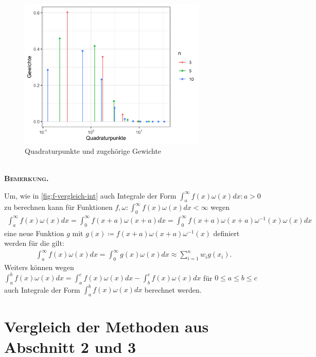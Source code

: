\documentclass[12pt,a4paper]{scrartcl}
\numberwithin{equation}{section}
\numberwithin{myalgctr}{section}
\numberwithin{mytheoremctr}{subsection}
\numberwithin{mykorollarctr}{subsection}
\numberwithin{mylemmactr}{subsection}
\numberwithin{mybeispielctr}{subsection}
\newenvironment{bemerkung}{%
	\bigskip\noindent%
	\textsc{\textbf{\\Bemerkung.}}%
	\indent
}{\par\bigskip}  %
\begin{document}
	\begin{figure}[H]
		\begin{center}
			\includegraphics[width=0.8\textwidth]{../plots/quadraturpunkte-n-zusammen.png}
		\end{center}
		\caption{Quadraturpunkte und zugeh\"orige Gewichte}
		\label{fig:quadraturpunkte}
	\end{figure}

	\begin{bemerkung}
		Um, wie in \cref{fig:f-vergleich-int} auch Integrale der Form $\int_{a}^{\infty}f(x)\omega(x)dx:a>0$ zu berechnen kann f\"ur Funktionen $f,\omega:\int_{0}^{\infty}f(x)\omega(x)dx<\infty$ wegen \autocite[vgl.][278]{ana2}
		\begin{align*}
		\int_{a}^{\infty}f(x)\omega(x)dx = \int_{0}^{\infty}f(x+a)\omega(x+a)dx = \int_{0}^{\infty}f(x+a)\omega(x+a)\omega^{-1}(x)\omega(x)dx
		\end{align*}
		eine neue Funktion $g$ mit $g(x) \coloneqq f(x+a)\omega(x+a)\omega^{-1}(x)$ definiert werden f\"ur die gilt:
		\begin{align*}
		\int_{a}^{\infty}f(x)\omega(x)dx = \int_{0}^{\infty}g(x)\omega(x)dx \approx  \sum_{i=1}^{n}w_ig(x_i).
		\end{align*}
		Weiters k\"onnen wegen $\int_{a}^{b}f(x)\omega(x)dx = \int_{a}^{c}f(x)\omega(x)dx - \int_{b}^{c}f(x)\omega(x)dx$ f\"ur $0\leq a\leq b\leq c$ auch Integrale der Form $\int_{a}^{b}f(x)\omega(x)dx$ berechnet werden.
	\end{bemerkung}
	
	\newpage
	\section{Vergleich der Methoden aus Abschnitt 2 und 3} %
	
\end{document}
